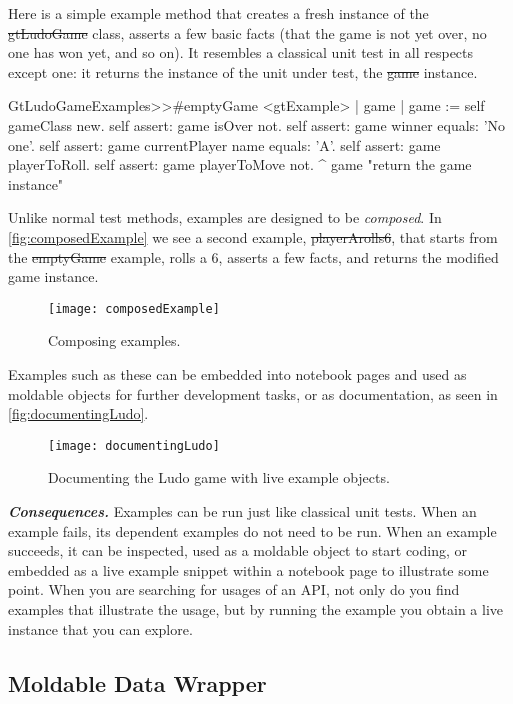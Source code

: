 \documentclass[acmsmall,screen,authorversion,nonacm]{acmart} %
\newcommand\dd[1]{\nbe{Daniel}{#1}{magenta}} %
\newcommand{\pattern}[2]{\subsection*{#1}\label{pat:#2}}
\newcommand{\patsec}[1]{\noindent\textit{\textbf{#1.}}\xspace}
\begin{document}
Here is a simple example method that creates a fresh instance of the \st{gtLudoGame} class, asserts a few basic facts (\ie that the game is not yet over, no one has won yet, and so on).
It resembles a classical unit test in all respects except one: it returns the instance of the unit under test, \ie the \st{game} instance.

\dd{monospace font?}

\begin{code}
GtLudoGameExamples>>#emptyGame
	<gtExample>
	| game |
	game := self gameClass new.
	self assert: game isOver not.
	self assert: game winner equals: 'No one'.
	self assert: game currentPlayer name equals: 'A'.
	self assert: game playerToRoll.
	self assert: game playerToMove not.
	^ game  "return the game instance"
\end{code}

Unlike normal test methods, examples are designed to be \emph{composed}.
In \autoref{fig:composedExample} we see a second example, \st{playerArolls6}, that starts from the \st{emptyGame} example, rolls a $6$, asserts a few facts, and returns the modified game instance.

\begin{figure}[h]
  \texttt{[image: composedExample]}
  \caption{Composing examples.}
  \label{fig:composedExample}
\end{figure}

Examples such as these can be embedded into notebook pages and used as moldable objects for further development tasks, or as documentation, as seen in \autoref{fig:documentingLudo}.

\begin{figure}[h]
  \texttt{[image: documentingLudo]}
  \caption{Documenting the Ludo game with live example objects.}
  \label{fig:documentingLudo}
\end{figure}

    
\patsec{Consequences}
Examples can be run just like classical unit tests.
When an example fails, its dependent examples do not need to be run.
When an example succeeds, it can be inspected, used as a moldable object to start coding, or embedded as a live example snippet within a notebook page to illustrate some point.
When you are searching for usages of an API, not only do you find examples that illustrate the usage, but by running the example you obtain a live instance that you can explore.

\pattern{Moldable Data Wrapper}{moldableDataWrapper}
\end{document}
